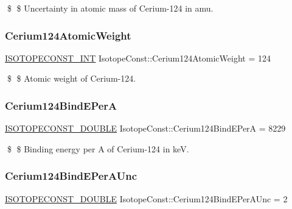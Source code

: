 \$ \$ Uncertainty in atomic mass of Cerium-\/124 in amu. \mbox{\label{group___isotope_const-_cerium-_ce124_ga66093ac50218b3dd1c8487e6fc343485}} 
\subsubsection{\texorpdfstring{Cerium124\+Atomic\+Weight}{Cerium124AtomicWeight}}
{\footnotesize\ttfamily \mbox{\hyperlink{group___isotope_const-_macros_ga5f18360b3e99483a35c32d789e62621c}{I\+S\+O\+T\+O\+P\+E\+C\+O\+N\+S\+T\+\_\+\+I\+NT}} Isotope\+Const\+::\+Cerium124\+Atomic\+Weight = 124}

\$ \$ Atomic weight of Cerium-\/124. \mbox{\label{group___isotope_const-_cerium-_ce124_gaed9e5b65423fb3f85374e992e2660ff4}} 
\subsubsection{\texorpdfstring{Cerium124\+Bind\+E\+PerA}{Cerium124BindEPerA}}
{\footnotesize\ttfamily \mbox{\hyperlink{group___isotope_const-_macros_ga8f45a7272ce02c0b4c65c44636ed719a}{I\+S\+O\+T\+O\+P\+E\+C\+O\+N\+S\+T\+\_\+\+D\+O\+U\+B\+LE}} Isotope\+Const\+::\+Cerium124\+Bind\+E\+PerA = 8229}

\$ \$ Binding energy per A of Cerium-\/124 in keV. \mbox{\label{group___isotope_const-_cerium-_ce124_ga8b38c411428a95e05df0dacb2580c878}} 
\subsubsection{\texorpdfstring{Cerium124\+Bind\+E\+Per\+A\+Unc}{Cerium124BindEPerAUnc}}
{\footnotesize\ttfamily \mbox{\hyperlink{group___isotope_const-_macros_ga8f45a7272ce02c0b4c65c44636ed719a}{I\+S\+O\+T\+O\+P\+E\+C\+O\+N\+S\+T\+\_\+\+D\+O\+U\+B\+LE}} Isotope\+Const\+::\+Cerium124\+Bind\+E\+Per\+A\+Unc = 2}

